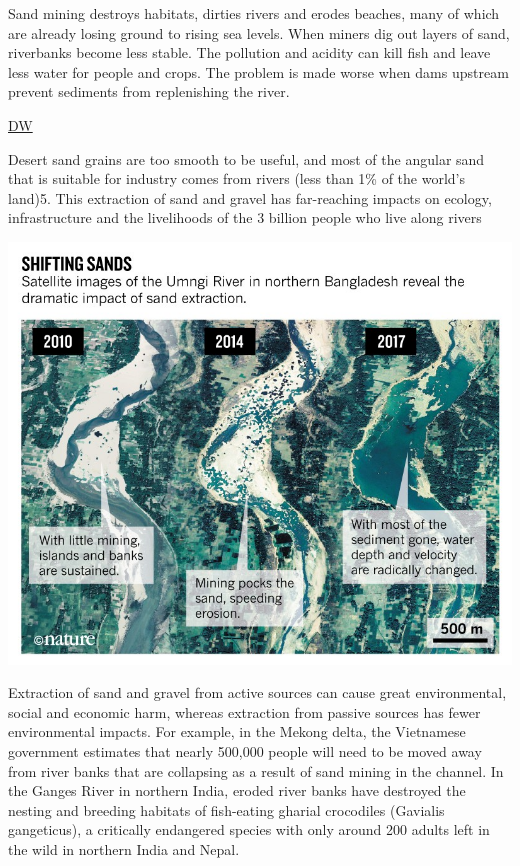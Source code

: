 \documentclass[
]{book}
\begin{document}
Sand mining destroys habitats, dirties rivers and erodes beaches, many of which are already losing ground to rising sea levels. When miners dig out layers of sand, riverbanks become less stable. The pollution and acidity can kill fish and leave less water for people and crops. The problem is made worse when dams upstream prevent sediments from replenishing the river.

\href{https://www.dw.com/en/sand-crisis-shortage-supply-mafia/a-56714226}{DW}

Desert sand grains are too smooth to be useful, and most of the angular sand that is suitable for industry comes from rivers (less than 1\% of the world's land)5. This extraction of sand and gravel has far-reaching impacts on ecology, infrastructure and the livelihoods of the 3 billion people who live along rivers

\includegraphics{fig/sand_mining_bangladesh.jpg}

Extraction of sand and gravel from active sources can cause great environmental, social and economic harm, whereas extraction from passive sources has fewer environmental impacts. For example, in the Mekong delta, the Vietnamese government estimates that nearly 500,000 people will need to be moved away from river banks that are collapsing as a result of sand mining in the channel. In the Ganges River in northern India, eroded river banks have destroyed the nesting and breeding habitats of fish-eating gharial crocodiles (Gavialis gangeticus), a critically endangered species with only around 200 adults left in the wild in northern India and Nepal.
\end{document}
